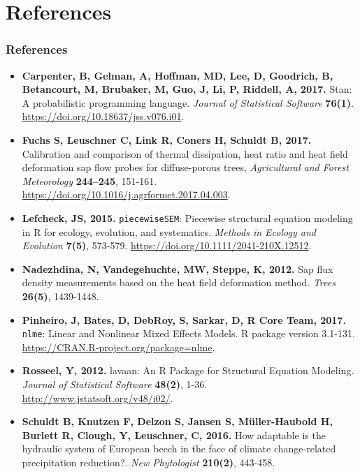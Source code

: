 \documentclass[usepdftitle=false]{beamer}
\newenvironment{changemargin}[2]{%
	\begin{list}{}{%
			\setlength{\topsep}{0pt}%
			\setlength{\leftmargin}{#1}%
			\setlength{\rightmargin}{#2}%
			\setlength{\listparindent}{\parindent}%
			\setlength{\itemindent}{\parindent}%
			\setlength{\parsep}{\parskip}%
		}%
		\item[]}
	{\end{list}
}
\begin{document}
{
	\begin{frame}[plain]
	\end{frame}
}

\section{References}
\begin{frame}[t]
	\frametitle{References}
	\begin{changemargin}{-2em}{-2em}
		\tiny
		\begin{itemize}
			\item \textbf{Carpenter, B, Gelman, A, Hoffman, MD, Lee, D, Goodrich, B, Betancourt, M, Brubaker, M, Guo, J, Li, P, Riddell, A, 2017.} Stan: A probabilistic programming language. \textit{Journal of Statistical Software} \textbf{76(1)}. \url{https://doi.org/10.18637/jss.v076.i01}.
			\item \textbf{Fuchs S, Leuschner C, Link R, Coners H, Schuldt B, 2017.}
			Calibration and comparison of thermal dissipation, heat ratio and heat field deformation sap flow probes for diffuse-porous trees,
			\textit{Agricultural and Forest Meteorology} \textbf{244–245}, 151-161. \url{https://doi.org/10.1016/j.agrformet.2017.04.003}.
			\item \textbf{Lefcheck, JS, 2015.} \texttt{piecewiseSEM}: Piecewise structural equation modeling in R for ecology, evolution, and systematics. \textit{Methods in Ecology and Evolution} \textbf{7(5)}, 573-579. \url{https://doi.org/10.1111/2041-210X.12512}.
			\item \textbf{Nadezhdina, N, Vandegehuchte, MW, Steppe, K, 2012.} Sap flux density measurements based on the heat field deformation method. \textit{Trees} \textbf{26(5)}, 1439-1448.
			\item \textbf{Pinheiro, J, Bates, D, DebRoy, S, Sarkar, D, R Core Team, 2017.} \texttt{nlme}: Linear and Nonlinear Mixed Effects Models. R package version 3.1-131. \url{https://CRAN.R-project.org/package=nlme}.	
			\item  \textbf{Rosseel, Y, 2012.} lavaan: An R Package for Structural Equation Modeling. \textit{Journal of Statistical Software} \textbf{48(2)},	1-36. \url{http://www.jstatsoft.org/v48/i02/}.		
			\item \textbf{Schuldt B, Knutzen F, Delzon S, Jansen S, Müller-Haubold H, Burlett R, Clough, Y, Leuschner, C, 2016.} How adaptable is the hydraulic system of European beech in the face of climate change-related precipitation reduction?. \textit{New Phytologist} \textbf{210(2)}, 443-458.

\end{itemize}
\end{changemargin}
\end{frame}
\end{document}
